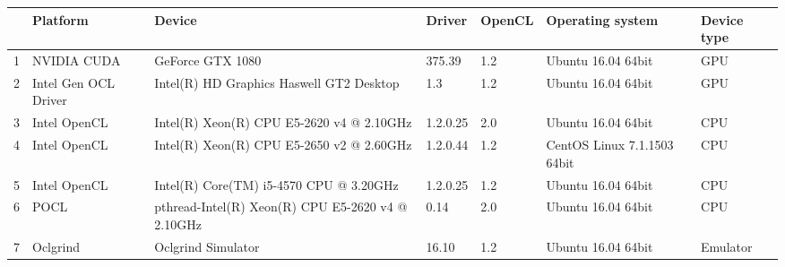 \begin{tabular}{lllllll}
\toprule
{} &              Platform &                                             Device &    Driver & OpenCL &             Operating system & Device type \\
\midrule
1 &           NVIDIA CUDA &                                   GeForce GTX 1080 &    375.39 &    1.2 &           Ubuntu 16.04 64bit &         GPU \\
2 &  Intel Gen OCL Driver &           Intel(R) HD Graphics Haswell GT2 Desktop &       1.3 &    1.2 &           Ubuntu 16.04 64bit &         GPU \\
3 &          Intel OpenCL &          Intel(R) Xeon(R) CPU E5-2620 v4 @ 2.10GHz &  1.2.0.25 &    2.0 &           Ubuntu 16.04 64bit &         CPU \\
4 &          Intel OpenCL &          Intel(R) Xeon(R) CPU E5-2650 v2 @ 2.60GHz &  1.2.0.44 &    1.2 &  CentOS Linux 7.1.1503 64bit &         CPU \\
5 &          Intel OpenCL &            Intel(R) Core(TM) i5-4570 CPU @ 3.20GHz &  1.2.0.25 &    1.2 &           Ubuntu 16.04 64bit &         CPU \\
6 &                  POCL &  pthread-Intel(R) Xeon(R) CPU E5-2620 v4 @ 2.10GHz &      0.14 &    2.0 &           Ubuntu 16.04 64bit &         CPU \\
7 &              Oclgrind &                                 Oclgrind Simulator &     16.10 &    1.2 &           Ubuntu 16.04 64bit &    Emulator \\
\bottomrule
\end{tabular}
